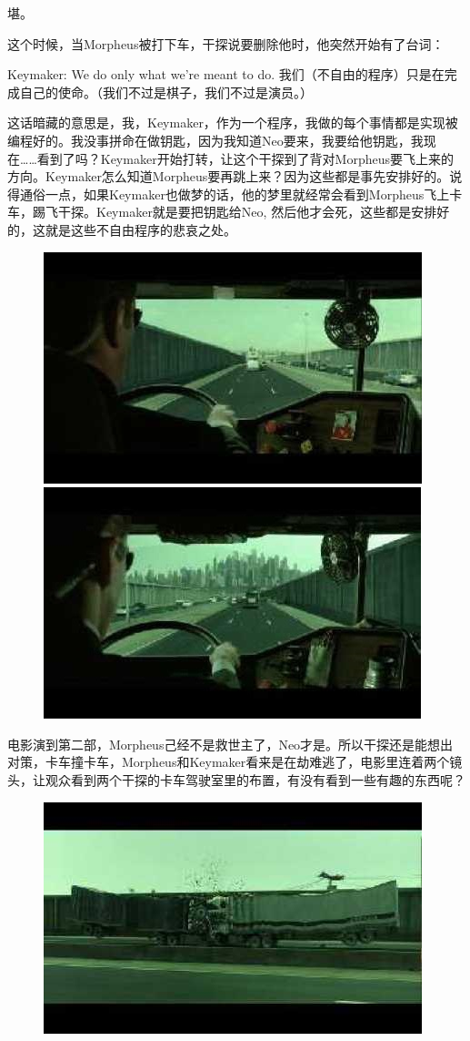 \documentclass{ctexart}
\begin{document}
堪。

这个时候，当Morpheus被打下车，干探说要删除他时，他突然开始有了台词：

Keymaker: We do only what we're meant to do. 我们（不自由的程序）只是在完成自己的使命。（我们不过是棋子，我们不过是演员。）

这话暗藏的意思是，我，Keymaker，作为一个程序，我做的每个事情都是实现被编程好的。我没事拼命在做钥匙，因为我知道Neo要来，我要给他钥匙，我现在……看到了吗？Keymaker开始打转，让这个干探到了背对Morpheus要飞上来的方向。Keymaker怎么知道Morpheus要再跳上来？因为这些都是事先安排好的。说得通俗一点，如果Keymaker也做梦的话，他的梦里就经常会看到Morpheus飞上卡车，踢飞干探。Keymaker就是要把钥匙给Neo, 然后他才会死，这些都是安排好的，这就是这些不自由程序的悲哀之处。

\begin{figure}[htb]
\centering
\includegraphics[width=0.45\linewidth]{fig/read_reloaded-139}
\includegraphics[width=0.45\linewidth]{fig/read_reloaded-139-1}
\end{figure}

电影演到第二部，Morpheus己经不是救世主了，Neo才是。所以干探还是能想出对策，卡车撞卡车，Morpheus和Keymaker看来是在劫难逃了，电影里连着两个镜头，让观众看到两个干探的卡车驾驶室里的布置，有没有看到一些有趣的东西呢？

\begin{figure}[htb]
\centering
\includegraphics[width=0.5\linewidth]{fig/read_reloaded-140}
\end{figure}
\end{document}
